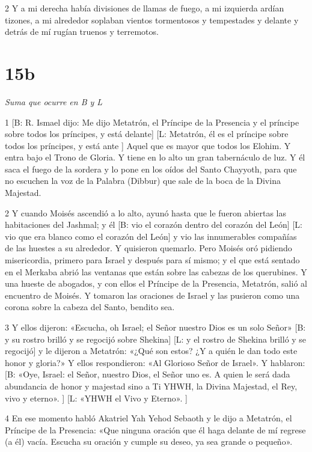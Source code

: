 \par 2 Y a mi derecha había divisiones de llamas de fuego, a mi izquierda ardían tizones, a mi alrededor soplaban vientos tormentosos y tempestades y delante y detrás de mí rugían truenos y terremotos.

\chapter{15b}

\par \textit{Suma que ocurre en B y L}

\par 1 [B: R. Ismael dijo: Me dijo Metatrón, el Príncipe de la Presencia y el príncipe sobre todos los príncipes, y está delante] [L: Metatrón, él es el príncipe sobre todos los príncipes, y está ante ] Aquel que es mayor que todos los Elohim. Y entra bajo el Trono de Gloria. Y tiene en lo alto un gran tabernáculo de luz. Y él saca el fuego de la sordera y lo pone en los oídos del Santo Chayyoth, para que no escuchen la voz de la Palabra (Dibbur) que sale de la boca de la Divina Majestad.

\par 2 Y cuando Moisés ascendió a lo alto, ayunó hasta que le fueron abiertas las habitaciones del Jashmal; y él [B: vio el corazón dentro del corazón del León] [L: vio que era blanco como el corazón del León] y vio las innumerables compañías de las huestes a su alrededor. Y quisieron quemarlo. Pero Moisés oró pidiendo misericordia, primero para Israel y después para sí mismo; y el que está sentado en el Merkaba abrió las ventanas que están sobre las cabezas de los querubines. Y una hueste de abogados, y con ellos el Príncipe de la Presencia, Metatrón, salió al encuentro de Moisés. Y tomaron las oraciones de Israel y las pusieron como una corona sobre la cabeza del Santo, bendito sea.

\par 3 Y ellos dijeron: «Escucha, oh Israel; el Señor nuestro Dios es un solo Señor» [B: y su rostro brilló y se regocijó sobre Shekina] [L: y el rostro de Shekina brilló y se regocijó] y le dijeron a Metatrón: «¿Qué son estos? ¿Y a quién le dan todo este honor y gloria?» Y ellos respondieron: «Al Glorioso Señor de Israel». Y hablaron: [B: «Oye, Israel: el Señor, nuestro Dios, el Señor uno es. A quien le será dada abundancia de honor y majestad sino a Ti YHWH, la Divina Majestad, el Rey, vivo y eterno». ] [L: «YHWH el Vivo y Eterno». ]

\par 4 En ese momento habló Akatriel Yah Yehod Sebaoth y le dijo a Metatrón, el Príncipe de la Presencia: «Que ninguna oración que él haga delante de mí regrese (a él) vacía. Escucha su oración y cumple su deseo, ya sea grande o pequeño».

